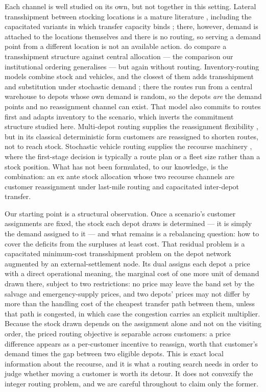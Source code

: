 \documentclass[authoryear,final,3p,times]{elsarticle}
\theoremstyle{definition}
\theoremstyle{plain}
\begin{document}
Each channel is well studied on its own, but not together in this setting.
Lateral transshipment between stocking locations is a mature literature
\citep{paterson2011lateral}, including the capacitated variants in which
transfer capacity binds \citep{ozdemir2006capacitated}; there, however, demand
is attached to the locations themselves and there is no routing, so serving a
demand point from a different location is not an available action.
\citet{rosales2013retailer} do compare a transshipment structure against
central allocation --- the comparison our institutional ordering generalises
--- but again without routing. Inventory-routing models combine stock and
vehicles, and the closest of them adds transshipment and substitution under
stochastic demand \citep{achamrah2022spare}; there the routes run from a
central warehouse to depots whose own demand is random, so the depots
\emph{are} the demand points and no reassignment channel can exist. That model
also commits to routes first and adapts inventory to the scenario, which
inverts the commitment structure studied here. Multi-depot routing supplies the
reassignment flexibility \citep{cordeau1997vrp,montoyatorres2015literature},
but in its classical deterministic form customers are reassigned to shorten
routes, not to reach stock. Stochastic vehicle routing supplies the recourse
machinery \citep{gendreau1996stochastic,gendreau2016future}, where the
first-stage decision is typically a route plan or a fleet size rather than a
stock position. What has not been formulated, to our knowledge, is the
combination: an ex ante stock allocation whose two recourse channels are
customer reassignment under last-mile routing and capacitated inter-depot
transfer.

Our starting point is a structural observation. Once a scenario's customer
assignments are fixed, the stock each depot draws is determined --- it is
simply the demand assigned to it --- and what remains is a rebalancing
question: how to cover the deficits from the surpluses at least cost. That
residual problem is a capacitated minimum-cost transshipment problem on the
depot network augmented by an external-settlement node. Its dual assigns each
depot a price with a direct operational meaning, the marginal cost of one more
unit of demand drawn there, subject to two restrictions: no price may leave the
band set by the salvage and emergency-supply prices, and two depots' prices may
not differ by more than the handling cost of the cheapest transfer path between
them, unless that path is congested, in which case the congestion carries an
explicit multiplier. Because the stock drawn depends on the assignment alone
and not on the visiting order, the priced routing objective is separable across
customers: a price difference appears as a per-customer incentive to reassign,
worth that customer's demand times the gap between two eligible depots. This is
exact local information about the recourse, and it is what a routing search
needs in order to judge whether moving a customer is worth its detour. It does
not convexify the integer routing problem, and we are careful throughout to
claim only the former.
\end{document}
